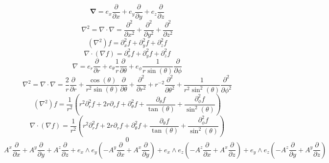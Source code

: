 \documentclass[10pt,fleqn]{report}
\newcommand{\bfrac}[2]{\displaystyle\frac{#1}{#2}}
\newcommand{\lp}{\left (}
\newcommand{\rp}{\right )}
\begin{document}
\begin{equation*} \boldsymbol{\nabla}  = e_{x} \bfrac{\partial}{\partial x} + e_{y} \bfrac{\partial}{\partial y} + e_{z} \bfrac{\partial}{\partial z} \end{equation*}
\begin{equation*} \nabla^{2} = \nabla\cdot\nabla = \bfrac{\partial^{2}}{\partial x^{2}} + \bfrac{\partial^{2}}{\partial y^{2}} + \bfrac{\partial^{2}}{\partial z^{2}} \end{equation*}
\begin{equation*} \lp\nabla^{2}\rp f = \partial^{2}_{x} f  + \partial^{2}_{y} f  + \partial^{2}_{z} f \end{equation*}
\begin{equation*} \nabla\cdot\lp\nabla f\rp = \partial^{2}_{x} f  + \partial^{2}_{y} f  + \partial^{2}_{z} f \end{equation*}
\begin{equation*} \nabla = e_{r} \bfrac{\partial}{\partial r} + e_{\theta } \frac{1}{r} \bfrac{\partial}{\partial \theta } + e_{\phi } \frac{1}{r \sin{\left (\theta  \right )}} \bfrac{\partial}{\partial \phi } \end{equation*}
\begin{equation*} \nabla^{2} = \nabla\cdot\nabla = \frac{2}{r} \bfrac{\partial}{\partial r} + \frac{\cos{\left (\theta  \right )}}{r^{2} \sin{\left (\theta  \right )}} \bfrac{\partial}{\partial \theta } + \bfrac{\partial^{2}}{\partial r^{2}} + r^{-2} \bfrac{\partial^{2}}{\partial \theta ^{2}} + \frac{1}{r^{2} \sin^{2}{\left (\theta  \right )}} \bfrac{\partial^{2}}{\partial \phi ^{2}} \end{equation*}
\begin{equation*} \lp\nabla^{2}\rp f = \frac{1}{r^{2}} \left(r^{2} \partial^{2}_{r} f  + 2 r \partial_{r} f  + \partial^{2}_{\theta } f  + \frac{\partial_{\theta } f }{\tan{\left (\theta  \right )}} + \frac{\partial^{2}_{\phi } f }{\sin^{2}{\left (\theta  \right )}}\right) \end{equation*}
\begin{equation*} \nabla\cdot\lp\nabla f\rp = \frac{1}{r^{2}} \left(r^{2} \partial^{2}_{r} f  + 2 r \partial_{r} f  + \partial^{2}_{\theta } f  + \frac{\partial_{\theta } f }{\tan{\left (\theta  \right )}} + \frac{\partial^{2}_{\phi } f }{\sin^{2}{\left (\theta  \right )}}\right) \end{equation*}
\begin{equation*} 0 \end{equation*}
\begin{equation*} A^{x} \bfrac{\partial}{\partial x} + A^{y} \bfrac{\partial}{\partial y} + A^{z} \bfrac{\partial}{\partial z} + e_{x}\wedge e_{y} \left ( - A^{y} \bfrac{\partial}{\partial x} + A^{x} \bfrac{\partial}{\partial y}\right )  + e_{x}\wedge e_{z} \left ( - A^{z} \bfrac{\partial}{\partial x} + A^{x} \bfrac{\partial}{\partial z}\right )  + e_{y}\wedge e_{z} \left ( - A^{z} \bfrac{\partial}{\partial y} + A^{y} \bfrac{\partial}{\partial z}\right ) \end{equation*}
\end{document}
